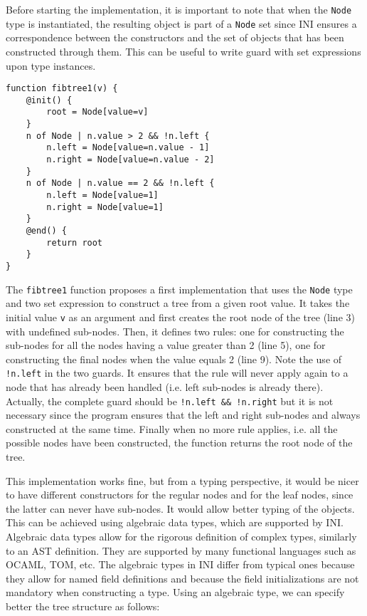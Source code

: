 \documentclass[11pt]{report}
\begin{document}
Before starting the implementation, it is important to note that when the \texttt{Node} type is instantiated, the resulting object is part of a \texttt{Node} set since INI ensures a correspondence between the constructors and the set of objects that has been constructed through them. This can be useful to write guard with set expressions upon type instances.

\begin{lstlisting}
function fibtree1(v) {
	@init() {
		root = Node[value=v]
	}
	n of Node | n.value > 2 && !n.left {
		n.left = Node[value=n.value - 1]
		n.right = Node[value=n.value - 2]
	}
	n of Node | n.value == 2 && !n.left {
		n.left = Node[value=1]
		n.right = Node[value=1]
	}
	@end() {
		return root
	}
}
\end{lstlisting}

The \texttt{fibtree1} function proposes a first implementation that uses the \texttt{Node} type and two set expression to construct a tree from a given root value. It takes the initial value \texttt{v} as an argument and first creates the root node of the tree (line 3) with undefined sub-nodes. Then, it defines two rules: one for constructing the sub-nodes for all the nodes having a value greater than 2 (line 5), one for constructing the final nodes when the value equals 2 (line 9). Note the use of \texttt{!n.left} in the two guards. It ensures that the rule will never apply again to a node that has already been handled (i.e. left sub-nodes is already there). Actually, the complete guard should be \texttt{!n.left \&\& !n.right} but it is not necessary since the program ensures that the left and right sub-nodes and always constructed at the same time. Finally when no more rule applies, i.e. all the possible nodes have been constructed, the function returns the root node of the tree.

This implementation works fine, but from a typing perspective, it would be nicer to have different constructors for the regular nodes and for the leaf nodes, since the latter can never have sub-nodes. It would allow better typing of the objects. This can be achieved using algebraic data types, which are supported by INI. Algebraic data types allow for the rigorous definition of complex types, similarly to an AST definition. They are supported by many functional languages such as OCAML, TOM, etc. The algebraic types in INI differ from typical ones because they allow for named field definitions and because the field initializations are not mandatory when constructing a type. Using an algebraic type, we can specify better the tree structure as follows:
\end{document}
